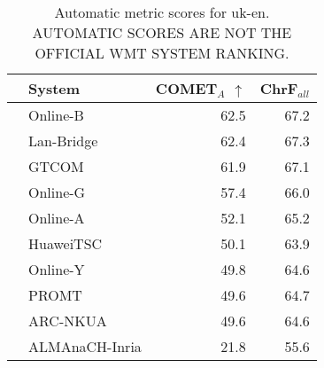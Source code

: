 \begin{table}
\centering
\caption{Automatic metric scores for uk-en. \\AUTOMATIC SCORES ARE NOT THE OFFICIAL WMT SYSTEM RANKING.}
\begin{tabular}{llrr}
\toprule
          &          System &  COMET$_{A}$ $\uparrow$ &  ChrF$_{all}$ \\
\midrule
 \Uncon{} &        Online-B &                    62.5 &          67.2 \\
 \Uncon{} &      Lan-Bridge &                    62.4 &          67.3 \\
 \Uncon{} &           GTCOM &                    61.9 &          67.1 \\
 \Uncon{} &        Online-G &                    57.4 &          66.0 \\
 \Uncon{} &        Online-A &                    52.1 &          65.2 \\
 \Const{} &       HuaweiTSC &                    50.1 &          63.9 \\
 \Uncon{} &        Online-Y &                    49.8 &          64.6 \\
 \Uncon{} &           PROMT &                    49.6 &          64.7 \\
 \Uncon{} &        ARC-NKUA &                    49.6 &          64.6 \\
 \Const{} &  ALMAnaCH-Inria &                    21.8 &          55.6 \\
\bottomrule
\end{tabular}
\end{table}



